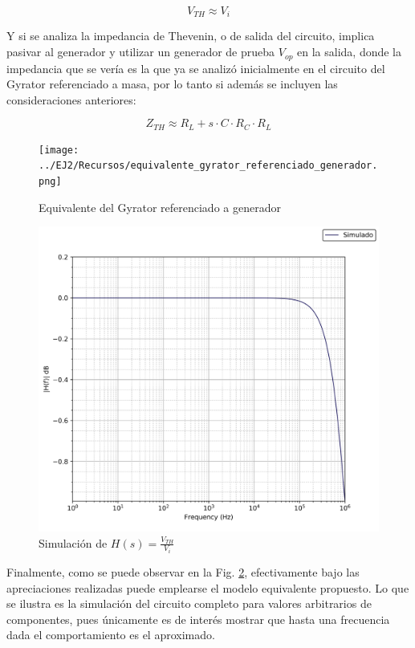 \begin{equation}
    V_{TH} \approx V_i
\end{equation}

Y si se analiza la impedancia de Thevenin, o de salida del circuito, implica pasivar al generador y utilizar un generador de prueba $V_{op}$ en la salida, donde la impedancia que se ver\'ia
es la que ya se analiz\'o inicialmente en el circuito del Gyrator referenciado a masa, por lo tanto si adem\'as se incluyen las consideraciones anteriores:

\begin{equation}
    Z_{TH} \approx R_L + s \cdot C \cdot R_C \cdot R_L
\end{equation}

\begin{figure}[H]
    \centering
    \texttt{[image: ../EJ2/Recursos/equivalente\_gyrator\_referenciado\_generador.png]}
    \caption{Equivalente del Gyrator referenciado a generador}
    \label{fig:equivalente_referenciado}
\end{figure}

\begin{figure}[H]
    \centering
    \includegraphics[scale=0.5]{../EJ2/Recursos/gyrator_simulado.png}
    \caption{Simulaci\'on de $H(s) = \frac{V_{TH}}{V_i}$}
    \label{fig:resultados_gyrator_referenciado}
\end{figure}

Finalmente, como se puede observar en la Fig. \ref{fig:resultados_gyrator_referenciado}, efectivamente bajo las apreciaciones realizadas
puede emplearse el modelo equivalente propuesto. Lo que se ilustra es la simulaci\'on del circuito completo para valores arbitrarios de componentes,
pues \'unicamente es de inter\'es mostrar que hasta una frecuencia dada el comportamiento es el aproximado.

